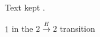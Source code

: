 \documentclass{revtex4-1}
\begin{document}
Text kept \cite{Feng}. \x
\begin{thebibliography}{1}
   {in the $2 \xrightarrow{H} 2$ transition}
\end{thebibliography}
\end{document}
